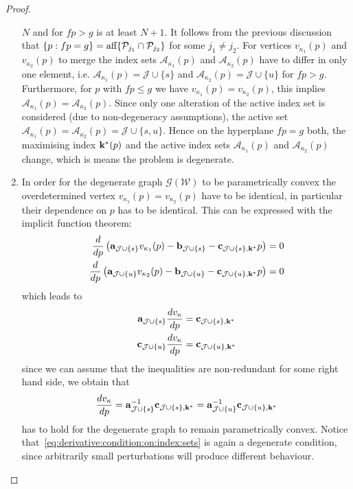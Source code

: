 \documentclass[journal]{IEEEtran}
\theoremstyle{remark}
\theoremstyle{definition}
\begin{document}
\begin{proof}
\begin{enumerate}
$N$ and for $fp>g$ is at least $N+1$.
%
It follows from the previous discussion that $\{p:fp=g\} = \textup{aff}\{\mathcal P_{j_1}\cap\mathcal P_{j_2}\}$ for some $j_1\neq j_2$.
%
For vertices $v_{\kappa_1}(p)$ and $v_{\kappa_2}(p)$ to merge the index sets $\mathcal A_{\kappa_1}(p)$ and 
$\mathcal A_{\kappa_2}(p)$ have to differ in only one 
element, i.e. $\mathcal A_{\kappa_1}(p) = \mathcal J\cup \{s\}$ and $\mathcal A_{\kappa_2}(p) = \mathcal J\cup\{u\}$ for $fp>g$.
%
Furthermore, for $p$ with $fp\leq g$ we have $v_{\kappa_1}(p)=v_{\kappa_2}(p)$, this implies $\mathcal A_{\kappa_1}(p) = 
\mathcal A_{\kappa_2}(p)$.
%
Since only one alteration of the active index set is considered (due to non-degeneracy assumptions), the active set 
$\mathcal A_{\kappa_1}(p) = \mathcal A_{\kappa_2}(p) = \mathcal J \cup \{s,u\}$.
%
Hence on the hyperplane $fp=g$ both, the maximising index ${\bf{k}}^\ast(p)$ and the active index sets $\mathcal A_{\kappa_1}(p)$ 
and $\mathcal A_{\kappa_2}(p)$ change, which is means the problem is degenerate.
%
\item In order for the degenerate graph $\mathscr G(\mathcal W)$ to be parametrically convex the overdetermined 
vertex $v_{\kappa_1}(p)=v_{\kappa_2}(p)$ have to be identical, in particular their dependence on $p$ has to be identical.
%
This can be expressed with the implicit function theorem:
%
\begin{equation*}\begin{split}
  \frac{d}{dp}\left(  {\bf{a}}_{\mathcal J\cup \{s\}} v_{\kappa_1}(p) - {\bf{b}}_{\mathcal J\cup \{s\}} - 
  {\bf{c}}_{\mathcal J\cup \{s\},{\bf{k}}^\ast} p\right) &= 0\\
  \frac{d}{dp}\left(  {\bf{a}}_{\mathcal J\cup \{u\}} v_{\kappa_2}(p) - {\bf{b}}_{\mathcal J\cup \{u\}} - 
  {\bf{c}}_{\mathcal J\cup \{u\},{\bf{k}}^\ast} p\right) &= 0
\end{split}\end{equation*}
%
which leads to 
%
\begin{equation*}\begin{split}
  {\bf{a}}_{\mathcal J\cup \{s\}} \frac{dv_{\kappa}}{dp} &= {\bf{c}}_{\mathcal J\cup \{s\},{\bf{k}}^\ast}\\
  {\bf{c}}_{\mathcal J\cup \{u\}} \frac{dv_{\kappa}}{dp} &= {\bf{c}}_{\mathcal J\cup \{u\},{\bf{k}}^\ast}
\end{split}\end{equation*}
%
since we can assume that the inequalities are non-redundant for some right hand side, we obtain that 
%
\begin{equation}\label{eq:derivative:condition:on:index:sets}
  \frac{dv_\kappa}{dp} = {\bf{a}}_{\mathcal J\cup \{s\}}^{-1}{\bf{c}}_{\mathcal J\cup \{s\},{\bf{k}}^\ast} = 
  {\bf{a}}_{\mathcal J\cup \{u\}}^{-1}{\bf{c}}_{\mathcal J\cup \{u\},{\bf{k}}^\ast}
\end{equation}
%
has to hold for the degenerate graph to remain parametrically convex.
%
Notice that~\eqref{eq:derivative:condition:on:index:sets} is again a degenerate condition, since arbitrarily small perturbations
will produce different behaviour.
\end{enumerate}
\end{proof}
\end{document}
